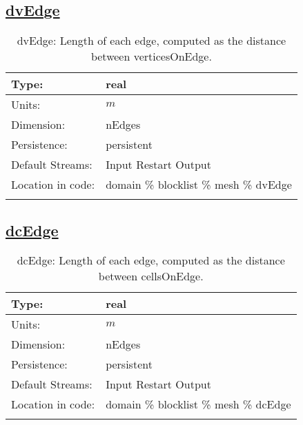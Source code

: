 \subsection[dvEdge]{\hyperref[sec:var_tab_mesh]{dvEdge}}
\label{subsec:var_sec_mesh_dvEdge}
\begin{center}
\begin{longtable}{| p{2.0in} | p{4.0in} |}
        \hline 
        Type: & real \\
        \hline 
        Units: & $m$ \\
        \hline 
        Dimension: & nEdges \\
        \hline 
        Persistence: & persistent \\
        \hline 
		 Default Streams: & Input Restart Output  \\
        \hline 
		 Location in code: & domain \% blocklist \% mesh \% dvEdge \\
		 \hline 
    \caption{dvEdge: Length of each edge, computed as the distance between verticesOnEdge.}
\end{longtable}
\end{center}
\subsection[dcEdge]{\hyperref[sec:var_tab_mesh]{dcEdge}}
\label{subsec:var_sec_mesh_dcEdge}
\begin{center}
\begin{longtable}{| p{2.0in} | p{4.0in} |}
        \hline 
        Type: & real \\
        \hline 
        Units: & $m$ \\
        \hline 
        Dimension: & nEdges \\
        \hline 
        Persistence: & persistent \\
        \hline 
		 Default Streams: & Input Restart Output  \\
        \hline 
		 Location in code: & domain \% blocklist \% mesh \% dcEdge \\
		 \hline 
    \caption{dcEdge: Length of each edge, computed as the distance between cellsOnEdge.}
\end{longtable}
\end{center}
